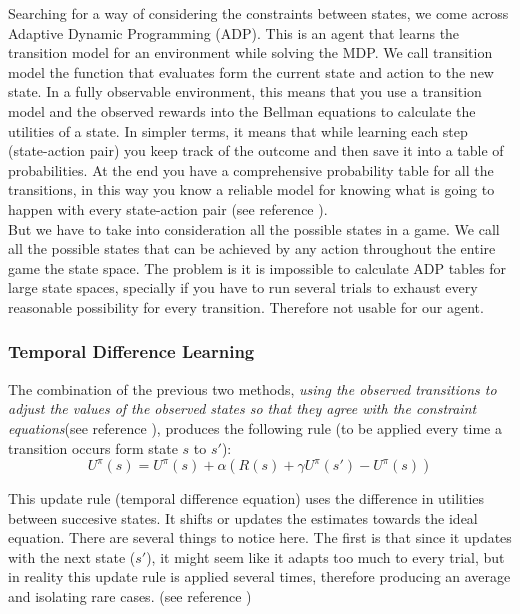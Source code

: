 Searching for a way of considering the constraints between states, we come across Adaptive Dynamic Programming (ADP). This is an agent that learns the transition model for an environment while solving the MDP. We call transition model the function that evaluates form the current state and action to the new state. In a fully observable environment, this means that you use a transition model and the observed rewards into the Bellman equations to calculate the utilities of a state. In simpler terms, it means that while learning each step (state-action pair) you keep track of the outcome and then save it into a table of probabilities. At the end you have a comprehensive probability table for all the transitions, in this way you know a reliable model for knowing what is going to happen with every state-action pair  (see reference \cite{rl}).\\


But we have to take into consideration all the possible states in a game. We call all the possible states that can be achieved by any action throughout the entire game the state space. The problem is it is impossible to calculate ADP tables for large state spaces, specially if you have to run several trials to exhaust every reasonable possibility for every transition. Therefore not usable for our agent. \\


\subsubsection{Temporal Difference Learning} \label{TDE}

The combination of the previous two methods, \textit{using the observed transitions to adjust the values of the observed states so that they agree with the constraint equations}(see reference \cite[p767]{rl}), produces the following rule (to be applied every time a transition occurs form state $s$ to $s'$):\\

\begin{equation}
U^\pi(s) = U^\pi(s) + \alpha(R(s)+\gamma U^\pi(s') -  U^\pi(s))
\end{equation}

This update rule (temporal difference equation) uses the difference in utilities between succesive states. It shifts or updates the estimates towards the ideal equation. There are several things to notice here. The first is that since it updates with the next state ($s'$), it might seem like it adapts too much to every trial, but in reality this update rule is applied several times, therefore producing an average and isolating rare cases. (see reference \cite{rl}) \\

